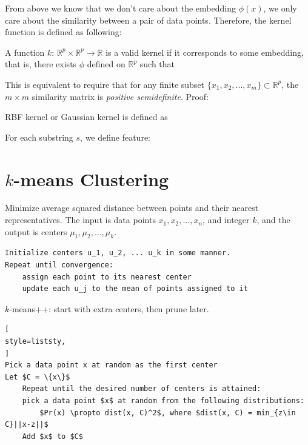  From above we know that we don't care about the embedding $\phi(x)$, we only 
care about the similarity between a pair of data points. Therefore, the kernel function is defined as following:
\vspace{0.5cm}
\begin{definition}
    A function $k$: $\mathbb{R}^p \times \mathbb{R}^p \rightarrow \mathbb{R}$ is a valid kernel if it corresponds to some embedding, that is, there exists $\phi$ defined on $\mathbb{R}^p$ such that
\end{definition}

This is equivalent to require that for any finite subset $\{x_1, x_2, ..., x_m\} \subset \mathbb{R}^p$,
the $m \times m$ similarity matrix 
is \textit{positive semidefinite}. Proof:

RBF kernel or Gaussian kernel is defined as

For each substring $s$, we define feature:


\section{$k$-means Clustering}
 Minimize average squared distance between points and their nearest representatives.
The input is data points $x_1, x_2, ..., x_n$, and integer $k$, and the output is centers
$\mu_1, \mu_2, ..., \mu_k$.

\begin{verbatim}
Initialize centers u_1, u_2, ... u_k in some manner.
Repeat until convergence:
    assign each point to its nearest center
    update each u_j to the mean of points assigned to it
\end{verbatim}

 $k$-means++: start with extra centers, then prune later.

\begin{lstlisting}[
style=liststy,
]
Pick a data point x at random as the first center
Let $C = \{x\}$
    Repeat until the desired number of centers is attained:
    pick a data point $x$ at random from the following distributions: 
        $Pr(x) \propto dist(x, C)^2$, where $dist(x, C) = min_{z\in C}||x-z||$
    Add $x$ to $C$
\end{lstlisting}

